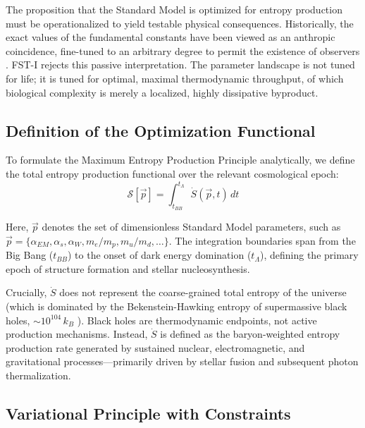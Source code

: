 \documentclass[12pt,a4paper]{article}
\theoremstyle{remark}
\begin{document}
The proposition that the Standard Model is optimized for entropy production must be operationalized to yield testable physical consequences. Historically, the exact values of the fundamental constants have been viewed as an anthropic coincidence, fine-tuned to an arbitrary degree to permit the existence of observers \citep{Adams2019}. FST-I rejects this passive interpretation. The parameter landscape is not tuned for life; it is tuned for optimal, maximal thermodynamic throughput, of which biological complexity is merely a localized, highly dissipative byproduct.

\subsection{Definition of the Optimization Functional}

To formulate the Maximum Entropy Production Principle analytically, we define the total entropy production functional over the relevant cosmological epoch:
\begin{equation}
\mathcal{S}[\vec{p}] = \int_{t_{BB}}^{t_\Lambda} \dot{S}(\vec{p}, t) \, dt
\end{equation}

Here, $\vec{p}$ denotes the set of dimensionless Standard Model parameters, such as $\vec{p} = \{\alpha_{EM}, \alpha_s, \alpha_W, m_e/m_p, m_u/m_d, \ldots\}$. The integration boundaries span from the Big Bang ($t_{BB}$) to the onset of dark energy domination ($t_\Lambda$), defining the primary epoch of structure formation and stellar nucleosynthesis.

Crucially, $\dot{S}$ does not represent the coarse-grained total entropy of the universe (which is dominated by the Bekenstein-Hawking entropy of supermassive black holes, $\sim 10^{104}\,k_B$ \citep{EntropyMaximum}). Black holes are thermodynamic endpoints, not active production mechanisms. Instead, $\dot{S}$ is defined as the baryon-weighted entropy production rate generated by sustained nuclear, electromagnetic, and gravitational processes---primarily driven by stellar fusion and subsequent photon thermalization.

\subsection{Variational Principle with Constraints}
\end{document}
